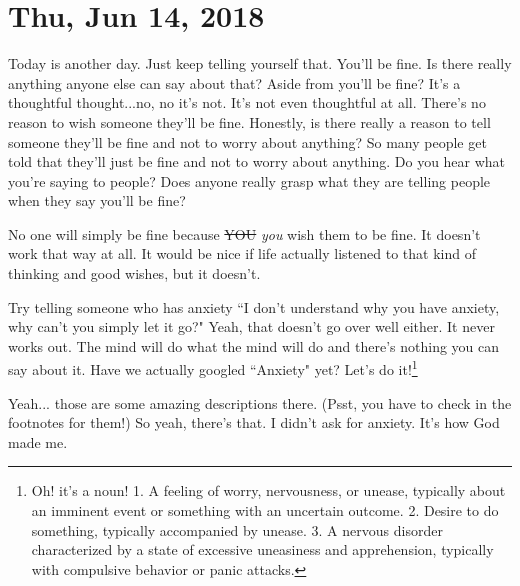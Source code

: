 \section{Thu, Jun 14, 2018}

Today is another day. Just keep telling yourself that. You'll be fine. Is there
really anything anyone else can say about that? Aside from you'll be fine? It's
a thoughtful thought...no, no it's not. It's not even thoughtful at all. There's
no reason to wish someone they'll be fine. Honestly, is there really a reason to
tell someone they'll be fine and not to worry about anything? So many people get
told that they'll just be fine and not to worry about anything. Do you hear what
you're saying to people? Does anyone really grasp what they are telling people
when they say you'll be fine?

No one will simply be fine because \st{YOU} \textit{you} wish them to be fine. 
It doesn't work that way at all. It would be nice if life actually listened to
that kind of thinking and good wishes, but it doesn't.

Try telling someone who has anxiety ``I don't understand why you have anxiety,
why can't you simply let it go?" Yeah, that doesn't go over well either. It
never works out. The mind will do what the mind will do and there's nothing you
can say about it. Have we actually googled ``Anxiety" yet? Let's do
it!\footnote{Oh! it's a noun! 1. A feeling of worry, nervousness, or unease, 
typically about an imminent event or something with an uncertain outcome. 2.
Desire to do something, typically accompanied by unease. 3. A nervous disorder 
characterized by a state of excessive uneasiness and apprehension, 
typically with compulsive behavior or panic attacks.}

Yeah... those are some amazing descriptions there. (Psst, you have to check in
  the footnotes for them!) So yeah, there's that. I didn't ask for anxiety. It's
how God made me.